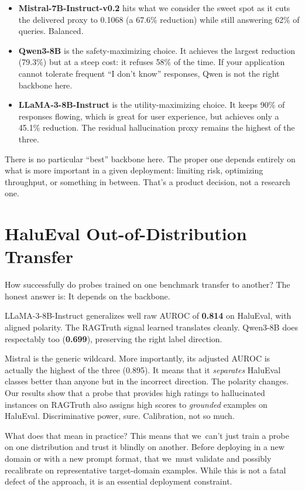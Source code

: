 \begin{itemize}
    \item \textbf{Mistral-7B-Instruct-v0.2} hits what we consider the sweet spot as it cuts the delivered proxy to 0.1068 (a 67.6\% reduction) while still answering 62\% of queries. Balanced.
    \item \textbf{Qwen3-8B} is the safety-maximizing choice. It achieves the largest reduction (79.3\%) but at a steep cost: it refuses 58\% of the time. If your application cannot tolerate frequent ``I don't know'' responses, Qwen is not the right backbone here.
    \item \textbf{LLaMA-3-8B-Instruct} is the utility-maximizing choice. It keeps 90\% of responses flowing, which is great for user experience, but achieves only a 45.1\% reduction. The residual hallucination proxy remains the highest of the three.
\end{itemize}

There is no particular ``best'' backbone here. The proper one depends entirely on what is more important in a given deployment: limiting risk, optimizing throughput, or something in between. That's a product decision, not a research one.

\section{HaluEval Out-of-Distribution Transfer}
\label{sec:halueval_discussion}

How successfully do probes trained on one benchmark transfer to another? The honest answer is: It depends on the backbone.

LLaMA-3-8B-Instruct generalizes well raw AUROC of \textbf{0.814} on HaluEval, with aligned polarity.  The RAGTruth signal learned translates cleanly. Qwen3-8B does respectably too (\textbf{0.699}), preserving the right label direction.

Mistral is the generic wildcard. More importantly, its adjusted AUROC is actually the highest of the three (0.895). It means that it \emph{separates} HaluEval classes better than anyone but in the incorrect direction. The polarity changes. Our results show that a probe that provides high ratings to hallucinated instances on RAGTruth also assigns high scores to \emph{grounded} examples on HaluEval. Discriminative power, sure. Calibration, not so much.

What does that mean in practice? This means that we can't just train a probe on one distribution and trust it blindly on another. Before deploying in a new domain or with a new prompt format, that we must validate and possibly recalibrate on representative target-domain examples. While this is not a fatal defect of the approach, it is an essential deployment constraint.


